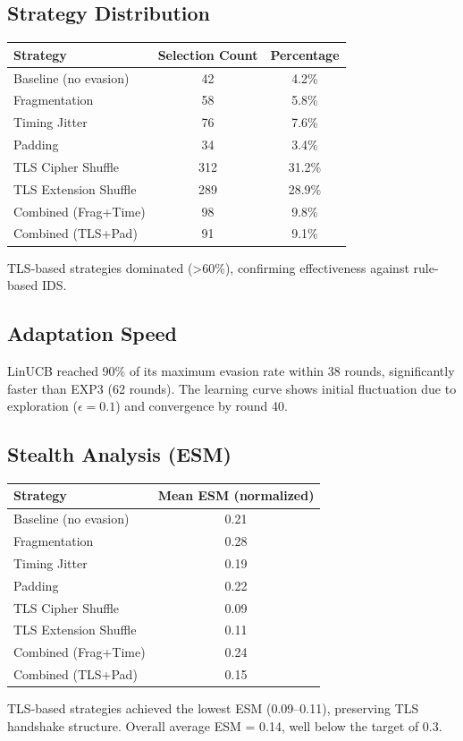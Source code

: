 \documentclass[review]{elsarticle}
\begin{document}
\subsection{Strategy Distribution}
\begin{table}[htbp]
\small
\centering
\renewcommand{\arraystretch}{1.2}
\begin{tabular}{|l|c|c|}
\hline
\textbf{Strategy} & \textbf{Selection Count} & \textbf{Percentage} \\
\hline
Baseline (no evasion) & 42 & 4.2\% \\
Fragmentation & 58 & 5.8\% \\
Timing Jitter & 76 & 7.6\% \\
Padding & 34 & 3.4\% \\
TLS Cipher Shuffle & 312 & 31.2\% \\
TLS Extension Shuffle & 289 & 28.9\% \\
Combined (Frag+Time) & 98 & 9.8\% \\
Combined (TLS+Pad) & 91 & 9.1\% \\
\hline
\end{tabular}
\end{table}
TLS-based strategies dominated (>60\%), confirming effectiveness against rule-based IDS.

\subsection{Adaptation Speed}
LinUCB reached 90\% of its maximum evasion rate within 38 rounds, significantly faster than EXP3 (62 rounds). The learning curve shows initial fluctuation due to exploration ($\epsilon=0.1$) and convergence by round 40.

\subsection{Stealth Analysis (ESM)}
\begin{table}[htbp]
\small
\centering
\renewcommand{\arraystretch}{1.2}
\begin{tabular}{|l|c|}
\hline
\textbf{Strategy} & \textbf{Mean ESM (normalized)} \\
\hline
Baseline (no evasion) & 0.21 \\
Fragmentation & 0.28 \\
Timing Jitter & 0.19 \\
Padding & 0.22 \\
TLS Cipher Shuffle & 0.09 \\
TLS Extension Shuffle & 0.11 \\
Combined (Frag+Time) & 0.24 \\
Combined (TLS+Pad) & 0.15 \\
\hline
\end{tabular}
\end{table}
TLS-based strategies achieved the lowest ESM (0.09–0.11), preserving TLS handshake structure. Overall average ESM = 0.14, well below the target of 0.3.
\end{document}
